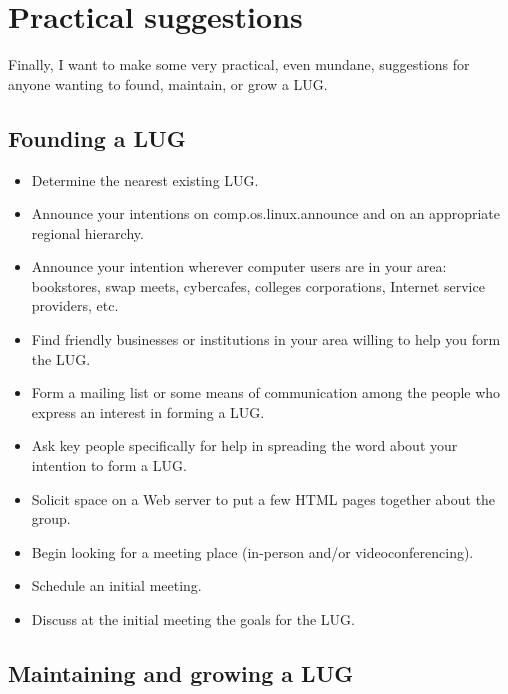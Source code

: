\section{Practical suggestions}

Finally, I want to make some very practical, even mundane, suggestions
for anyone wanting to found, maintain, or grow a LUG.

\subsection{Founding a LUG}

\begin{itemize}
\item Determine the nearest existing LUG.
\item Announce your intentions on {\ttfamily comp.os.linux.announce} and on an appropriate regional hierarchy.
\item Announce your intention wherever computer users are in your area: bookstores, swap meets, cybercafes, colleges corporations, Internet service providers, etc.
\item Find friendly businesses or institutions in your area willing to help you form the LUG.
\item Form a mailing list or some means of communication among the people who express an interest in forming a LUG.
\item Ask key people specifically for help in spreading the word about your intention to form a LUG.
\item Solicit space on a Web server to put a few HTML pages together about the group.
\item Begin looking for a meeting place (in-person and/or videoconferencing).
\item Schedule an initial meeting.
\item Discuss at the initial meeting the goals for the LUG.
\end{itemize}

\subsection{Maintaining and growing a LUG}

